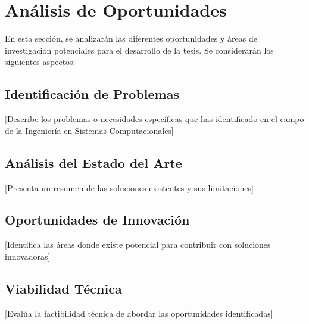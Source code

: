 \section{Análisis de Oportunidades}

En esta sección, se analizarán las diferentes oportunidades y áreas de investigación potenciales para el desarrollo de la tesis. Se considerarán los siguientes aspectos:

\subsection{Identificación de Problemas}
[Describe los problemas o necesidades específicas que has identificado en el campo de la Ingeniería en Sistemas Computacionales]

\subsection{Análisis del Estado del Arte}
[Presenta un resumen de las soluciones existentes y sus limitaciones]

\subsection{Oportunidades de Innovación}
[Identifica las áreas donde existe potencial para contribuir con soluciones innovadoras]

\subsection{Viabilidad Técnica}
[Evalúa la factibilidad técnica de abordar las oportunidades identificadas]